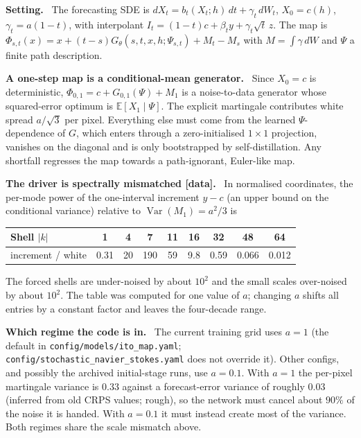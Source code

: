 \documentclass[11pt,a4paper]{article}
\newcommand{\E}{\mathbb{E}}
\newcommand{\Var}{\operatorname{Var}}
\newcommand{\status}[1]{\textsf{\small\color{black!60}[#1]}}
\newcommand{\head}[1]{\par\smallskip\noindent\textbf{#1}\ }
\begin{document}
\head{Setting.} The forecasting SDE is $dX_t=b_t(X_t;h)\,dt+\gamma_t\,dW_t$, $X_0=c(h)$, $\gamma_t=a(1-t)$, with interpolant $I_t=(1-t)c+\beta_ty+\gamma_t\sqrt t\,z$. The map is $\Phi_{s,t}(x)=x+(t-s)G_\theta(s,t,x,h;\Psi_{s,t})+M_t-M_s$ with $M=\int\gamma\,dW$ and $\Psi$ a finite path description.

\head{A one-step map is a conditional-mean generator.} Since $X_0=c$ is deterministic, $\Phi_{0,1}=c+G_{0,1}(\Psi)+M_1$ is a noise-to-data generator whose squared-error optimum is $\E[X_1\mid\Psi]$. The explicit martingale contributes white spread $a/\sqrt3$ per pixel. Everything else must come from the learned $\Psi$-dependence of $G$, which enters through a zero-initialised $1\times1$ projection, vanishes on the diagonal and is only bootstrapped by self-distillation. Any shortfall regresses the map towards a path-ignorant, Euler-like map.

\head{The driver is spectrally mismatched \status{data}.} In normalised coordinates, the per-mode power of the one-interval increment $y-c$ (an upper bound on the conditional variance) relative to $\Var(M_1)=a^2/3$ is

\begin{center}\small
\begin{tabular}{lcccccccc}
\toprule
Shell $|k|$ & 1 & 4 & 7 & 11 & 16 & 32 & 48 & 64\\
\midrule
increment / white & 0.31 & 20 & 190 & 59 & 9.8 & 0.59 & 0.066 & 0.012\\
\bottomrule
\end{tabular}
\end{center}

\noindent The forced shells are under-noised by about $10^2$ and the small scales over-noised by about $10^2$. The table was computed for one value of $a$; changing $a$ shifts all entries by a constant factor and leaves the four-decade range.

\head{Which regime the code is in.} The current training grid uses $a=1$ (the default in \texttt{config/models/ito\_map.yaml}; \texttt{config/stochastic\_navier\_stokes.yaml} does not override it). Other configs, and possibly the archived initial-stage runs, use $a=0.1$. With $a=1$ the per-pixel martingale variance is $0.33$ against a forecast-error variance of roughly $0.03$ (inferred from old CRPS values; rough), so the network must cancel about $90\%$ of the noise it is handed. With $a=0.1$ it must instead create most of the variance. Both regimes share the scale mismatch above.
\end{document}

